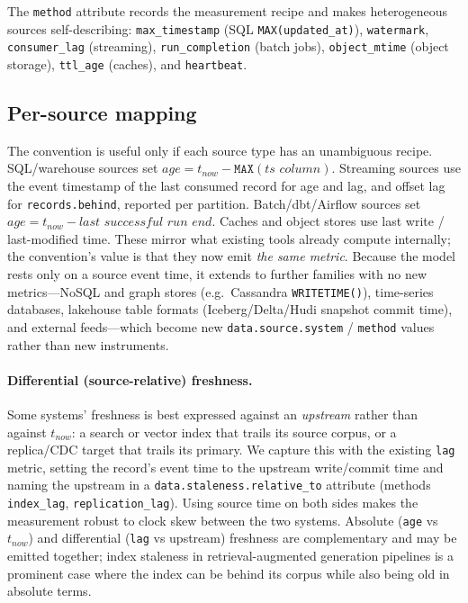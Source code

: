 \documentclass[11pt]{article}
\begin{document}
The \texttt{method} attribute records the measurement recipe and makes
heterogeneous sources self-describing: \texttt{max\_timestamp} (SQL
\texttt{MAX(updated\_at)}), \texttt{watermark}, \texttt{consumer\_lag}
(streaming), \texttt{run\_completion} (batch jobs), \texttt{object\_mtime}
(object storage), \texttt{ttl\_age} (caches), and \texttt{heartbeat}.

\subsection{Per-source mapping}
The convention is useful only if each source type has an unambiguous recipe.
SQL/warehouse sources set \(age = t_{now} - \texttt{MAX}(\textit{ts column})\).
Streaming sources use the event timestamp of the last consumed record for age
and lag, and offset lag for \texttt{records.behind}, reported per partition.
Batch/dbt/Airflow sources set \(age = t_{now} - \textit{last successful run
end}\). Caches and object stores use last write / last-modified time. These
mirror what existing tools already compute internally; the convention's value is
that they now emit \emph{the same metric}. Because the model rests only on a
source event time, it extends to further families with no new metrics---NoSQL
and graph stores (e.g.\ Cassandra \texttt{WRITETIME()}), time-series databases,
lakehouse table formats (Iceberg/Delta/Hudi snapshot commit time), and external
feeds---which become new \texttt{data.source.system} / \texttt{method} values
rather than new instruments.

\paragraph{Differential (source-relative) freshness.}
Some systems' freshness is best expressed against an \emph{upstream} rather than
against \(t_{now}\): a search or vector index that trails its source corpus, or
a replica/CDC target that trails its primary. We capture this with the existing
\texttt{lag} metric, setting the record's event time to the upstream
write/commit time and naming the upstream in a \texttt{data.staleness.relative\_to}
attribute (methods \texttt{index\_lag}, \texttt{replication\_lag}). Using source
time on both sides makes the measurement robust to clock skew between the two
systems. Absolute (\texttt{age} vs \(t_{now}\)) and differential
(\texttt{lag} vs upstream) freshness are complementary and may be emitted
together; index staleness in retrieval-augmented generation pipelines is a
prominent case where the index can be behind its corpus while also being old in
absolute terms.
\end{document}
